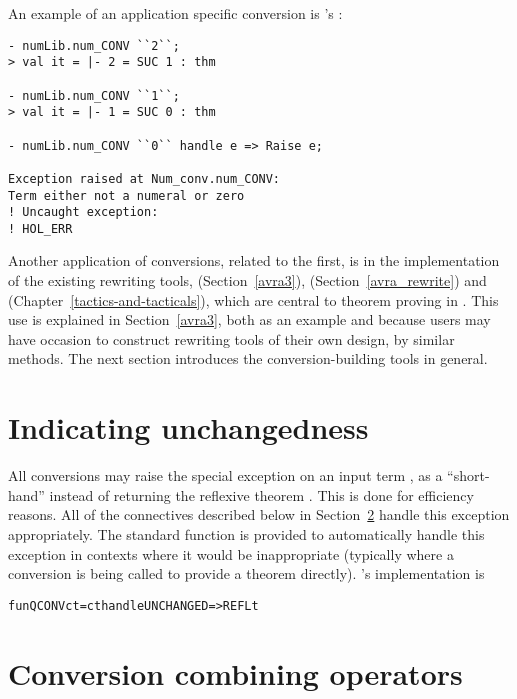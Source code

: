 \noindent An example of an application specific conversion is
's :

\setcounter{sessioncount}{1}
\begin{session}
\begin{verbatim}
- numLib.num_CONV ``2``;
> val it = |- 2 = SUC 1 : thm

- numLib.num_CONV ``1``;
> val it = |- 1 = SUC 0 : thm

- numLib.num_CONV ``0`` handle e => Raise e;

Exception raised at Num_conv.num_CONV:
Term either not a numeral or zero
! Uncaught exception:
! HOL_ERR
\end{verbatim}
\end{session}

Another application of conversions, related to the first, is in the
implementation of the existing rewriting tools, 
(Section~\ref{avra3}),  (Section~\ref{avra_rewrite})
and  (Chapter~\ref{tactics-and-tacticals}), which are
central to theorem proving in \HOL.  This use is explained in
Section~\ref{avra3}, both as an example and because users may have
occasion to construct rewriting tools of their own design, by similar
methods.  The next section introduces the conversion-building tools in
general.

\section{Indicating unchangedness}

All conversions may raise the special exception  on
an input term , as a ``short-hand'' instead of returning the
reflexive theorem .  This is done for efficiency reasons.
All of the connectives described below in Section~\ref{avra1} handle
this exception appropriately.  The standard function  is
provided to automatically handle this exception in contexts where it
would be inappropriate (typically where a conversion is being called
to provide a theorem directly).  's implementation is
\begin{alltt}
   fun QCONV c t = c t handle UNCHANGED => REFL t
\end{alltt}


\section{Conversion combining operators}
\label{avra1}

